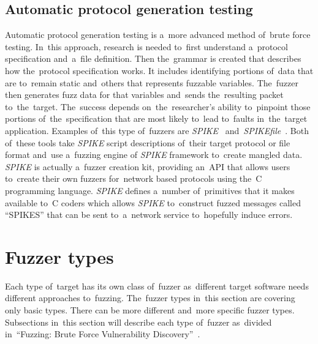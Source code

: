 \subsection{Automatic protocol generation testing}
Automatic protocol generation testing is a~more advanced method of~brute force
testing. In~this approach, research is needed to~first understand a~protocol
specification and~a~file definition. Then the~grammar is created that describes
how the~protocol specification works. It includes identifying portions of~data
that are to~remain static and~others that represents fuzzable variables.
The~fuzzer then generates fuzz data for that variables and~sends the~resulting
packet to~the~target. The~success depends on~the~researcher's ability
to~pinpoint those portions of~the~specification that are most likely to~lead
to~faults in~the~target application. Examples of~this type of~fuzzers are
\emph{SPIKE}~\cite{Aitel} and~\emph{SPIKEfile}~\cite{fuzzing.org}.
Both of~these tools take \emph{SPIKE} script descriptions of~their
target protocol or file format and~use a~fuzzing engine of \emph{SPIKE}
framework to~create mangled data. \emph{SPIKE} is actually a~fuzzer creation
kit, providing an~API that allows users to~create their own fuzzers for~network
based protocols using the~C programming language. \emph{SPIKE} defines
a~number of~primitives that it makes available to~C coders which allows \emph{SPIKE} to~construct fuzzed messages called ``SPIKES'' that can be sent to~a~network
service to~hopefully induce errors.


\section{Fuzzer types} \label{sec:types}
Each type of~target has its own class of~fuzzer as~different target software
needs different approaches to~fuzzing. The~fuzzer types in~this section are
covering only basic types. There can be more different and~more specific fuzzer types.
Subsections in~this section will describe each type of~fuzzer
as~divided in~``Fuzzing: Brute Force Vulnerability Discovery''~\cite{Fuzzing}.

